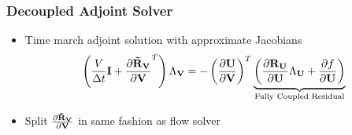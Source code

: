 \documentclass{beamer}
\begin{document}
\begin{frame}
  \frametitle{Decoupled Adjoint Solver}
  \begin{itemize}
    \item Time march adjoint solution with approximate Jacobians
      \begin{equation*}
        \left( \frac{V}{\Delta t} \mathbf I + \frac{\partial \mathbf{\tilde{R}_{\mathbf V}}}{\partial \mathbf V}^T \right) \Lambda_{\mathbf V}
        =
        - \left( \frac{\partial \mathbf U}{\partial \mathbf V} \right)^T
        \underbrace{
          \left( \frac{\partial \mathbf R_{{\mathbf U}_{}}}{\partial \mathbf U} \Lambda_{\mathbf U} + \frac{\partial f}{\partial \mathbf U} \right)
        }_\text{Fully Coupled Residual}
      \end{equation*}
    \item Split $\frac{\partial \mathbf{\tilde{R}_{\mathbf V}}}{\partial \mathbf V}$ in same fashion as flow solver
  \end{itemize}
\end{frame}
\end{document}
